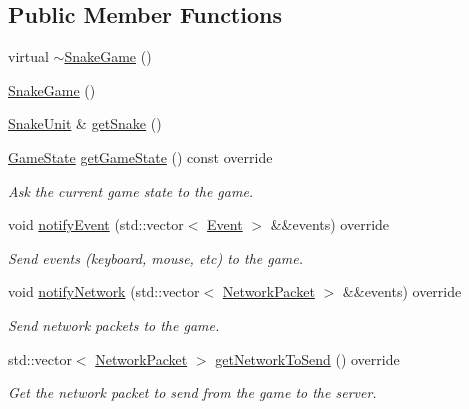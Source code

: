 \subsection*{Public Member Functions}
\begin{DoxyCompactItemize}
\item 
virtual \hyperlink{classarcade_1_1_snake_game_a9823e31ef82d6be7689a45933097a554}{$\sim$\+Snake\+Game} ()
\item 
\hyperlink{classarcade_1_1_snake_game_afe35e7494c88ea5a54061d70aecda9e2}{Snake\+Game} ()
\item 
\hyperlink{classarcade_1_1_snake_unit}{Snake\+Unit} \& \hyperlink{classarcade_1_1_snake_game_a4b709bb4139eac56f4f63461ac4324a3}{get\+Snake} ()
\item 
\hyperlink{namespacearcade_a6adca89ee2f539b03980c7e59b044ed7}{Game\+State} \hyperlink{classarcade_1_1_snake_game_afcd7d113f2187cd34396022af4e9e10c}{get\+Game\+State} () const override
\begin{DoxyCompactList}\small\item\em Ask the current game state to the game. \end{DoxyCompactList}\item 
void \hyperlink{classarcade_1_1_snake_game_a93016697def74ebd53a76e33fbb0e583}{notify\+Event} (std\+::vector$<$ \hyperlink{structarcade_1_1_event}{Event} $>$ \&\&events) override
\begin{DoxyCompactList}\small\item\em Send events (keyboard, mouse, etc) to the game. \end{DoxyCompactList}\item 
void \hyperlink{classarcade_1_1_snake_game_a8b4a36ff6ce940d86894433e88bb50f5}{notify\+Network} (std\+::vector$<$ \hyperlink{structarcade_1_1_network_packet}{Network\+Packet} $>$ \&\&events) override
\begin{DoxyCompactList}\small\item\em Send network packets to the game. \end{DoxyCompactList}\item 
std\+::vector$<$ \hyperlink{structarcade_1_1_network_packet}{Network\+Packet} $>$ \hyperlink{classarcade_1_1_snake_game_a8666c3ad148b7140658b52a262bfab73}{get\+Network\+To\+Send} () override
\begin{DoxyCompactList}\small\item\em Get the network packet to send from the game to the server. \end{DoxyCompactList}\item 

\end{DoxyCompactItemize}
